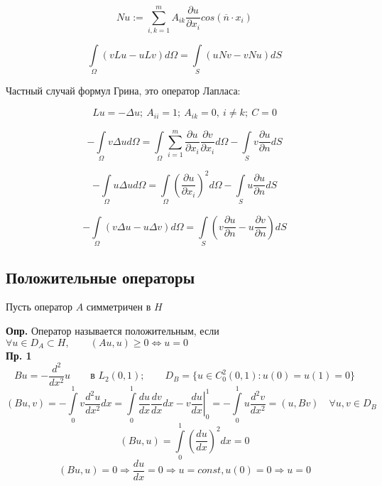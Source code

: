 \[ N u := \sum_{i,k=1}^{m } A_{ik } \frac{\partial u }{\partial x_i } cos(\overline{n} \cdot x_i) \]

\begin{equation}
	\label{3.3}
	\tag{3.3}
	\int\limits_{\Omega} \left( vLu - uLv \right) d\Omega = \int\limits_{S} \left( uNv - vNu \right) dS
\end{equation}

Частный случай формул Грина, это оператор Лапласа:

\[ Lu = - \Delta u; \ A_{ii} = 1; \ A_{ik} = 0, \ i \neq k; \ C = 0 \]

\begin{equation}
	\label{3.4}
	\tag{3.4}
	- \int\limits_{\Omega} v \Delta u d\Omega  = \int\limits_{\Omega}^{} \sum_{i=1}^{m } \frac{\partial u }{\partial x_i }  \frac{\partial v }{\partial x_i} d \Omega - \int\limits_{S }^{} v \frac{\partial u }{\partial n } dS
\end{equation}

\begin{equation}
	\label{3.5}
	\tag{3.5}
	- \int\limits_{\Omega} u \Delta u d \Omega = \int\limits_{\Omega}^{} {\left(\frac{\partial u }{\partial x_i}\right)}^2 d \Omega - \int\limits_{S }^{} u \frac{\partial u }{\partial n } dS
\end{equation}

\begin{equation}
	\label{3.6}
	\tag{3.6}
	- \int\limits_{\Omega} (v \Delta u - u \Delta v ) d\Omega = \int\limits_{S }^{} \left(v \frac{\partial u }{\partial n } - u \frac{\partial v}{\partial n}\right) dS
\end{equation}

\subsection{Положительные операторы}

Пусть оператор $A$ симметричен в $H$

\textbf{Опр.} Оператор называется положительным, если $ \forall u \in D_A \subset H, \qquad (Au, u) \geq 0 \Leftrightarrow u = 0 $ \\

\textbf{Пр. 1}
\[Bu = -\frac{ d^2 }{d x^2 }u \qquad \textrm{в } L_2 (0,1); \qquad D_B = \{u \in C^2_0 (0,1): u(0) = u(1) = 0\} \]
\[ (B u, v) = - \int\limits_{0}^{1} v  \frac{d^2 u }{d x^2} dx = \int\limits_{0}^{1} \frac{du }{dx} \frac{d v }{d x } dx - v \left.\frac{d u }{dx }\right|^1_0 = - \int\limits_{0}^{1} u \frac{d^2v }{dx^2 } = (u, Bv) \quad \forall u,v \in D_B \]
\[ (Bu, u) = \int\limits_{0}^{1} {\left(\frac{du }{dx }\right)}^2 dx = 0 \]
\[ (Bu, u) = 0 \Rightarrow \frac{du }{dx } = 0 \Rightarrow u = const, u(0) = 0 \Rightarrow u = 0 \]


